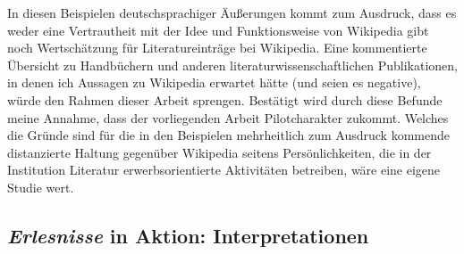 \documentclass[fontsize=12pt]{scrartcl}
\begin{document}
In diesen Beispielen deutschspra\-chi\-ger \"Au{\ss}erungen kommt zum Ausdruck, dass es weder eine Vertrautheit mit der Idee und Funktionsweise von Wi\-ki\-pe\-dia gibt noch Wertsch\"atzung f\"ur Li\-te\-ra\-tur\-eintr\"age bei Wi\-ki\-pe\-dia. Eine kommentierte \"Ubersicht zu Handb\"uchern und anderen li\-te\-ra\-tur\-wissenschaftlichen Publikationen, in denen ich Aussagen zu Wi\-ki\-pe\-dia erwartet h\"atte (und seien es negative), w\"urde den Rahmen dieser Arbeit sprengen. Best\"atigt wird durch diese Befunde meine Annahme, dass der vorliegenden Arbeit Pilot\textsuperscript{\tiny *}charakter zukommt. Welches die Gr\"unde sind f\"ur die in den Beispielen mehrheitlich zum Ausdruck kommende distanzierte Haltung gegen\"uber Wi\-ki\-pe\-dia sei\-tens Pers\"onlichkei\-ten, die in der Institution Li\-te\-ra\-tur erwerbsorientierte Ak\-ti\-vi\-t\"aten betreiben, w\"are eine eigene Studie wert.

\newpage

\subsection{\textit{Erlesnisse} in Aktion: Interpretationen}
\label{subsec:5.4}
\end{document}
